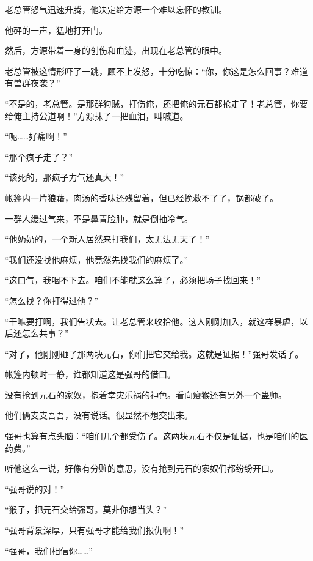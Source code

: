 
\begin{this_body}



老总管怒气迅速升腾，他决定给方源一个难以忘怀的教训。

他砰的一声，猛地打开门。

然后，方源带着一身的创伤和血迹，出现在老总管的眼中。

老总管被这情形吓了一跳，顾不上发怒，十分吃惊：“你，你这是怎么回事？难道有兽群夜袭？”

“不是的，老总管。是那群狗贼，打伤俺，还把俺的元石都抢走了！老总管，你要给俺主持公道啊！”方源抹了一把血泪，叫喊道。

“呃……好痛啊！”

“那个疯子走了？”

“该死的，那疯子力气还真大！”

帐篷内一片狼藉，肉汤的香味还残留着，但已经挽救不了了，锅都破了。

一群人缓过气来，不是鼻青脸肿，就是倒抽冷气。

“他奶奶的，一个新人居然来打我们，太无法无天了！”

“我们还没找他麻烦，他竟然先找我们的麻烦了。”

“这口气，我咽不下去。咱们不能就这么算了，必须把场子找回来！”

“怎么找？你打得过他？”

“干嘛要打啊，我们告状去。让老总管来收拾他。这人刚刚加入，就这样暴虐，以后还怎么共事？”

“对了，他刚刚砸了那两块元石，你们把它交给我。这就是证据！”强哥发话了。

帐篷内顿时一静，谁都知道这是强哥的借口。

没有抢到元石的家奴，抱着幸灾乐祸的神色。看向瘦猴还有另外一个蛊师。

他们俩支支吾吾，没有说话。很显然不想交出来。

强哥也算有点头脑：“咱们几个都受伤了。这两块元石不仅是证据，也是咱们的医药费。”

听他这么一说，好像有分赃的意思，没有抢到元石的家奴们都纷纷开口。

“强哥说的对！”

“猴子，把元石交给强哥。莫非你想当头？”

“强哥背景深厚，只有强哥才能给我们报仇啊！”

“强哥，我们相信你……”


\end{this_body}
